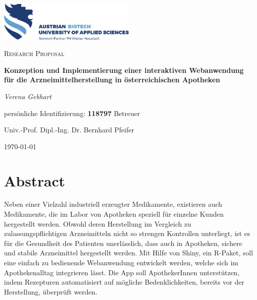 \documentclass[12pt,a4paper]{article}
\begin{document}
\begin{titlepage}
	\centering
	\includegraphics[width=0.5\textwidth]{logo}\par\vspace{1cm}
	\vspace{1cm}
	{\scshape\Large Research Proposal\par}
	\vspace{1.5cm}
	{\LARGE\bfseries Konzeption und Implementierung einer interaktiven 
	Webanwendung für die Arzneimittelherstellung in österreichischen Apotheken \par}
	\vspace{2cm}
	{\large\itshape Verena Gebhart\par}
	\vspace{0.5cm}
	persönliche Identifizierung: \textbf{118797}
	\vfill
	Betreuer\par
	Univ.-Prof. Dipl.-Ing. Dr. Bernhard Pfeifer

	\vfill

	{\large \today\par}
\end{titlepage}


\tableofcontents
\newpage
\section{Abstract}

Neben einer Vielzahl industriell erzeugter Medikamente, existieren auch Medikamente, die im Labor von Apotheken speziell für einzelne Kunden hergestellt werden. Obwohl deren Herstellung im Vergleich zu zulassungspflichtigen Arzneimitteln nicht so strengen Kontrollen unterliegt, ist es für die Gesundheit des Patienten unerlässlich, dass auch in Apotheken, sichere und stabile Arzneimittel hergestellt werden. 
Mit Hilfe von Shiny, ein R-Paket, soll eine einfach zu bedienende Webanwendung entwickelt werden, welche sich im Apothekenalltag integrieren lässt. Die App soll ApothekerInnen unterstützen, indem Rezepturen automatisiert auf mögliche Bedenklichkeiten, bereits vor der Herstellung, überprüft werden. 
\end{document}

